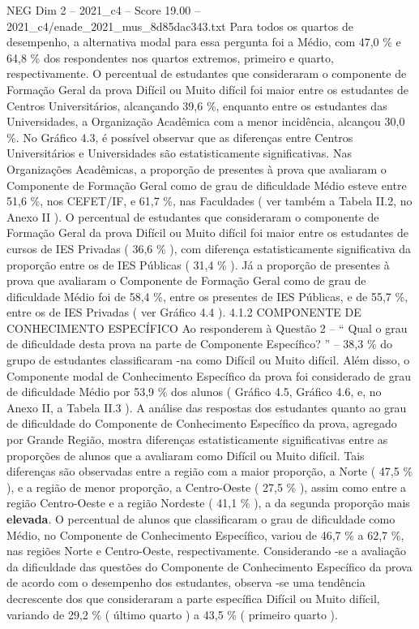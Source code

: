 \begin{textsample}{NEG Dim 2 – 2021\_c4 – Score 19.00 – 2021\_c4/enade\_2021\_mus\_8d85dac343.txt}
Para todos os quartos de desempenho, a alternativa modal para essa pergunta foi a Médio, com 47,0 \% e 64,8 \% dos respondentes nos quartos extremos, primeiro e quarto, respectivamente.
O percentual de estudantes que consideraram o componente de Formação Geral da prova Difícil ou Muito difícil foi maior entre os estudantes de Centros Universitários, alcançando 39,6 \%, enquanto entre os estudantes das Universidades, a Organização Acadêmica com a menor incidência, alcançou 30,0 \%.
No Gráfico 4.3, é possível observar que as diferenças entre Centros Universitários e Universidades são estatisticamente significativas.
Nas Organizações Acadêmicas, a proporção de presentes à prova que avaliaram o Componente de Formação Geral como de grau de dificuldade Médio esteve entre 51,6 \%, nos CEFET/IF, e 61,7 \%, nas Faculdades ( ver também a Tabela II.2, no Anexo II ).
O percentual de estudantes que consideraram o componente de Formação Geral da prova Difícil ou Muito difícil foi maior entre os estudantes de cursos de IES Privadas ( 36,6 \% ), com diferença estatisticamente significativa da proporção entre os de IES Públicas ( 31,4 \% ).
Já a proporção de presentes à prova que avaliaram o Componente de Formação Geral como de grau de dificuldade Médio foi de 58,4 \%, entre os presentes de IES Públicas, e de 55,7 \%, entre os de IES Privadas ( ver Gráfico 4.4 ). 4.1.2 COMPONENTE DE CONHECIMENTO ESPECÍFICO Ao responderem à Questão 2 – “ Qual o grau de dificuldade desta prova na parte de Componente Específico? ” – 38,3 \% do grupo de estudantes classificaram -na como Difícil ou Muito difícil.
Além disso, o Componente modal de Conhecimento Específico da prova foi considerado de grau de dificuldade Médio por 53,9 \% dos alunos ( Gráfico 4.5, Gráfico 4.6, e, no Anexo II, a Tabela II.3 ).
A análise das respostas dos estudantes quanto ao grau de dificuldade do Componente de Conhecimento Específico da prova, agregado por Grande Região, mostra diferenças estatisticamente significativas entre as proporções de alunos que a avaliaram como Difícil ou Muito difícil.
Tais diferenças são observadas entre a região com a maior proporção, a Norte ( 47,5 \% ), e a região de menor proporção, a Centro-Oeste ( 27,5 \% ), assim como entre a região Centro-Oeste e a região Nordeste ( 41,1 \% ), a da segunda proporção mais \textbf{elevada}.
O percentual de alunos que classificaram o grau de dificuldade como Médio, no Componente de Conhecimento Específico, variou de 46,7 \% a 62,7 \%, nas regiões Norte e Centro-Oeste, respectivamente.
Considerando -se a avaliação da dificuldade das questões do Componente de Conhecimento Específico da prova de acordo com o desempenho dos estudantes, observa -se uma tendência decrescente dos que consideraram a parte específica Difícil ou Muito difícil, variando de 29,2 \% ( último quarto ) a 43,5 \% ( primeiro quarto ).

\end{textsample}
